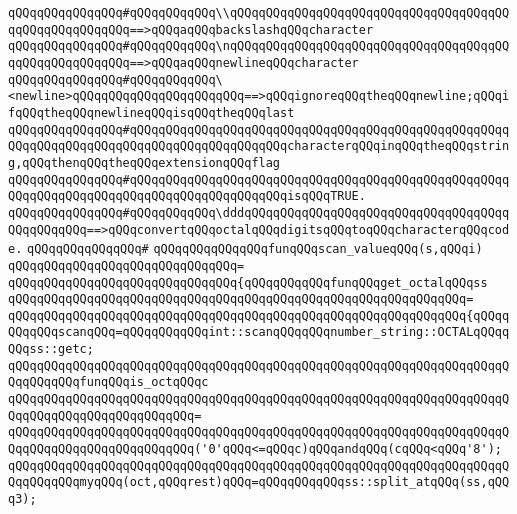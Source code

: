 \verb|qQQqqQQqqQQqqQQq#qQQqqQQqqQQq\\qQQqqQQqqQQqqQQqqQQqqQQqqQQqqQQqqQQqqQQqqQQqqQQqqQQqqQQq==>qQQqaqQQqbackslashqQQqcharacter|\newline
\verb|qQQqqQQqqQQqqQQq#qQQqqQQqqQQq\nqQQqqQQqqQQqqQQqqQQqqQQqqQQqqQQqqQQqqQQqqQQqqQQqqQQqqQQq==>qQQqaqQQqnewlineqQQqcharacter|\newline
\verb|qQQqqQQqqQQqqQQq#qQQqqQQqqQQq\<newline>qQQqqQQqqQQqqQQqqQQqqQQq==>qQQqignoreqQQqtheqQQqnewline;qQQqifqQQqtheqQQqnewlineqQQqisqQQqtheqQQqlast|\newline
\verb|qQQqqQQqqQQqqQQq#qQQqqQQqqQQqqQQqqQQqqQQqqQQqqQQqqQQqqQQqqQQqqQQqqQQqqQQqqQQqqQQqqQQqqQQqqQQqqQQqqQQqqQQqqQQqcharacterqQQqinqQQqtheqQQqstring,qQQqthenqQQqtheqQQqextensionqQQqflag|\newline
\verb|qQQqqQQqqQQqqQQq#qQQqqQQqqQQqqQQqqQQqqQQqqQQqqQQqqQQqqQQqqQQqqQQqqQQqqQQqqQQqqQQqqQQqqQQqqQQqqQQqqQQqqQQqqQQqisqQQqTRUE.|\newline
\verb|qQQqqQQqqQQqqQQq#qQQqqQQqqQQq\dddqQQqqQQqqQQqqQQqqQQqqQQqqQQqqQQqqQQqqQQqqQQqqQQq==>qQQqconvertqQQqoctalqQQqdigitsqQQqtoqQQqcharacterqQQqcode.|\newline
\verb|qQQqqQQqqQQqqQQq#|\newline
\verb|qQQqqQQqqQQqqQQqfunqQQqscan_valueqQQq(s,qQQqi)|\newline
\verb|qQQqqQQqqQQqqQQqqQQqqQQqqQQqqQQq=|\newline
\verb|qQQqqQQqqQQqqQQqqQQqqQQqqQQqqQQq{qQQqqQQqqQQqfunqQQqget_octalqQQqss|\newline
\verb|qQQqqQQqqQQqqQQqqQQqqQQqqQQqqQQqqQQqqQQqqQQqqQQqqQQqqQQqqQQqqQQq=|\newline
\verb|qQQqqQQqqQQqqQQqqQQqqQQqqQQqqQQqqQQqqQQqqQQqqQQqqQQqqQQqqQQqqQQq{qQQqqQQqqQQqscanqQQq=qQQqqQQqqQQqint::scanqQQqqQQqnumber_string::OCTALqQQqqQQqss::getc;|\newline
\newline
\verb|qQQqqQQqqQQqqQQqqQQqqQQqqQQqqQQqqQQqqQQqqQQqqQQqqQQqqQQqqQQqqQQqqQQqqQQqqQQqqQQqfunqQQqis_octqQQqc|\newline
\verb|qQQqqQQqqQQqqQQqqQQqqQQqqQQqqQQqqQQqqQQqqQQqqQQqqQQqqQQqqQQqqQQqqQQqqQQqqQQqqQQqqQQqqQQqqQQqqQQq=|\newline
\verb|qQQqqQQqqQQqqQQqqQQqqQQqqQQqqQQqqQQqqQQqqQQqqQQqqQQqqQQqqQQqqQQqqQQqqQQqqQQqqQQqqQQqqQQqqQQqqQQq('0'qQQq<=qQQqc)qQQqandqQQq(cqQQq<qQQq'8');|\newline
\newline
\verb|qQQqqQQqqQQqqQQqqQQqqQQqqQQqqQQqqQQqqQQqqQQqqQQqqQQqqQQqqQQqqQQqqQQqqQQqqQQqqQQqmyqQQq(oct,qQQqrest)qQQq=qQQqqQQqqQQqss::split_atqQQq(ss,qQQq3);|\newline
